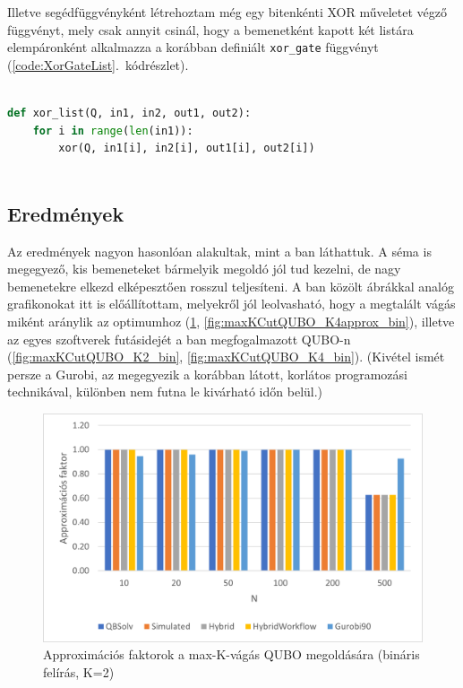 Illetve segédfüggvényként létrehoztam még egy bitenkénti XOR műveletet végző függvényt, mely csak annyit csinál, hogy a bemenetként kapott két listára elempáronként alkalmazza a korábban definiált \verb+xor_gate+ függvényt (\ref{code:XorGateList}.~kódrészlet).

\begin{lstlisting}[language=python,caption=Bitenkénti XOR művelet,label=code:XorGateList]
	
def xor_list(Q, in1, in2, out1, out2):
	for i in range(len(in1)):
		xor(Q, in1[i], in2[i], out1[i], out2[i])
	
\end{lstlisting}

\subsection{Eredmények}

Az eredmények nagyon hasonlóan alakultak, mint a ban láthattuk. A séma is megegyező, kis bemeneteket bármelyik megoldó jól tud kezelni, de nagy bemenetekre elkezd elképesztően rosszul teljesíteni. A ban közölt ábrákkal analóg grafikonokat itt is előállítottam, melyekről jól leolvasható, hogy a megtalált vágás miként aránylik az optimumhoz (\ref{fig:maxKCutQUBO_K2approx_bin}, \ref{fig:maxKCutQUBO_K4approx_bin}), illetve az egyes szoftverek futásidejét a ban megfogalmazott QUBO-n (\ref{fig:maxKCutQUBO_K2_bin}, \ref{fig:maxKCutQUBO_K4_bin}). (Kivétel ismét persze a Gurobi, az megegyezik a korábban látott, korlátos programozási technikával, különben nem futna le kivárható időn belül.)

\begin{figure}[!ht]
	\centering
	\includegraphics[width=150mm, keepaspectratio]{figures/diagrams/maxKCutQUBO_K2approx_bin.png}
	\caption{Approximációs faktorok a max-K-vágás QUBO megoldására (bináris felírás, K=2)}
	\label{fig:maxKCutQUBO_K2approx_bin}
\end{figure}

